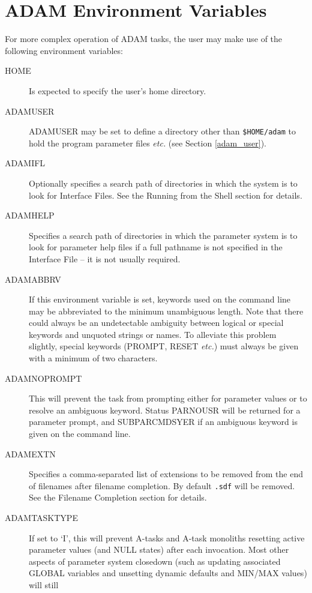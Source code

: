 \documentclass[twoside,11pt]{article}
\newcommand{\htmlref}[2]{#1}
\newcommand{\xlabel}[1]{}
\renewcommand{\_}{\texttt{\symbol{95}}}
\begin{document}
\newpage
\section{\xlabel{ADAM_environment_variables}\label{envars}ADAM Environment Variables}
For more complex operation of ADAM tasks, the user may make use of the following
environment variables:
\begin{description}
\item[HOME] Is expected to specify the user's home directory.
\item[ADAM\_USER] 
ADAM\_USER may be set to define a directory other than \texttt{\$HOME/adam}
to hold the program parameter files \textit{etc.} (see Section \ref{adam_user}).
\item[ADAM\_IFL] Optionally specifies a search path of directories in 
which the system is to look for Interface Files. 
See the 
\htmlref{Running from the Shell}{running_from_the_shell}
section for details.
\item[ADAM\_HELP] Specifies a search path of 
directories in which the parameter system is to look for parameter help files 
if a full pathname is not specified in the Interface File -- it is not 
usually required.
\item[ADAM\_ABBRV] 
If this environment variable is set, keywords used on the
command line may be abbreviated to the minimum unambiguous length.
Note that there could always be an undetectable ambiguity between logical or
special keywords and unquoted strings or names. To alleviate this problem
slightly, special keywords (PROMPT, RESET \textit{etc.}) must always be given
with a minimum of two characters.
\item[ADAM\_NOPROMPT] This will prevent the task from prompting either for
parameter values or to resolve an ambiguous keyword. Status PAR\_\_NOUSR will
be returned for a parameter prompt, and SUBPAR\_\_CMDSYER if an ambiguous
keyword is given on the command line.
\item[ADAM\_EXTN]
Specifies a comma-separated list of extensions to be removed from the end
of filenames after filename completion. By default \texttt{.sdf} will be
removed.
See the 
\htmlref{Filename Completion}{filename_completion}
section for details.
\item[ADAM\_TASK\_TYPE] 
If set to `I', this will prevent A-tasks and A-task monoliths
resetting active parameter values (and NULL states) after each invocation. 
Most other aspects of parameter system closedown (such as updating associated 
GLOBAL variables and unsetting dynamic defaults and MIN/MAX values) will still

\end{description}
\end{document}
